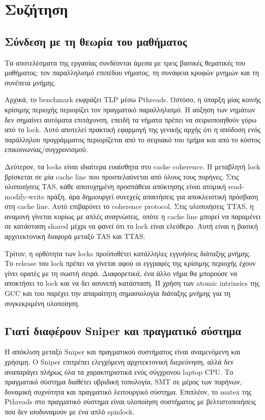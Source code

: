 \documentclass{article}
\newcommand{\code}[1]{\texttt{\detokenize{#1}}}
\begin{document}
\FloatBarrier

\section{Συζήτηση}

\subsection{Σύνδεση με τη θεωρία του μαθήματος}

Τα αποτελέσματα της εργασίας συνδέονται άμεσα με τρεις βασικές θεματικές του μαθήματος: τον παραλληλισμό επιπέδου νήματος, τη συνάφεια κρυφών μνημών και τη συνέπεια μνήμης.

Αρχικά, το benchmark εκφράζει TLP μέσω Pthreads. Ωστόσο, η ύπαρξη μίας κοινής κρίσιμης περιοχής περιορίζει τον πραγματικό παραλληλισμό. Η αύξηση των νημάτων δεν σημαίνει αυτόματα επιτάχυνση, επειδή τα νήματα πρέπει να σειριοποιηθούν γύρω από το lock. Αυτό αποτελεί πρακτική εφαρμογή της γενικής αρχής ότι η απόδοση ενός παράλληλου προγράμματος περιορίζεται από το σειριακό του τμήμα και από το κόστος επικοινωνίας/συγχρονισμού.

Δεύτερον, τα locks είναι ιδιαίτερα ευαίσθητα στο cache coherence. Η μεταβλητή lock βρίσκεται σε μία cache line που προσπελαύνεται από όλους τους πυρήνες. Στις υλοποιήσεις TAS, κάθε αποτυχημένη προσπάθεια απόκτησης είναι ατομική read-modify-write πράξη, άρα δημιουργεί συνεχείς απαιτήσεις για αποκλειστική πρόσβαση στη cache line. Αυτό επιβαρύνει το coherence protocol. Στις υλοποιήσεις TTAS, η αναμονή γίνεται κυρίως με απλές αναγνώσεις, οπότε η cache line μπορεί να παραμένει σε κατάσταση shared μέχρι να φανεί ότι το lock είναι ελεύθερο. Αυτή είναι η βασική αρχιτεκτονική διαφορά μεταξύ TAS και TTAS.

Τρίτον, η ορθότητα των locks προϋποθέτει κατάλληλες εγγυήσεις διάταξης μνήμης. Το release του lock πρέπει να γίνεται αφού οι εγγραφές της κρίσιμης περιοχής έχουν γίνει ορατές με τη σωστή σειρά. Διαφορετικά, ένα άλλο νήμα θα μπορούσε να αποκτήσει το lock και να δει ασυνεπή κατάσταση. Η χρήση των atomic intrinsics της GCC και του \code{pthread_mutex} παρέχει την απαραίτητη σημασιολογία διάταξης μνήμης για τη συγκεκριμένη υλοποίηση.

\subsection{Γιατί διαφέρουν Sniper και πραγματικό σύστημα}

Η απόκλιση μεταξύ Sniper και πραγματικού συστήματος είναι αναμενόμενη και χρήσιμη. Ο Sniper επιτρέπει ελεγχόμενη αρχιτεκτονική διερεύνηση, αλλά δεν αναπαράγει πλήρως όλα τα χαρακτηριστικά ενός σύγχρονου laptop CPU. Το πραγματικό σύστημα διαθέτει υβριδική τοπολογία, SMT σε μέρος των πυρήνων, δυναμική συχνότητα και πραγματικό λειτουργικό σύστημα. Επιπλέον, το mutex της Pthreads στο πραγματικό σύστημα είναι υλοποίηση συστήματος με βελτιστοποιήσεις που δεν ισοδυναμούν με ένα απλό spinlock.
\end{document}
